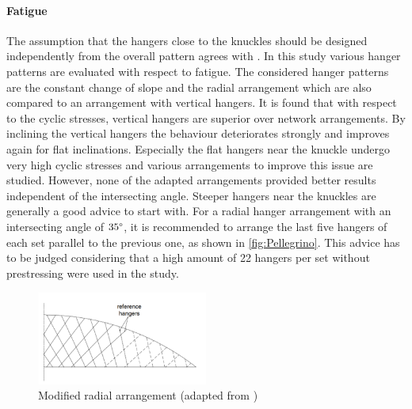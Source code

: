 \paragraph*{Fatigue}
The assumption that the hangers close to the knuckles should be designed independently from the overall pattern agrees with \citep{Pellegrino}. In this study various hanger patterns are evaluated with respect to fatigue. The considered hanger patterns are the constant change of slope and the radial arrangement which are also compared to an arrangement with vertical hangers. It is found that with respect to the cyclic stresses, vertical hangers are superior over network arrangements. By inclining the vertical hangers the behaviour deteriorates strongly and improves again for flat inclinations. Especially the flat hangers near the knuckle undergo very high cyclic stresses and various arrangements to improve this issue are studied. However, none of the adapted arrangements provided better results independent of the intersecting angle. Steeper hangers near the knuckles are generally a good advice to start with. For a radial hanger arrangement with an intersecting angle of $35\degree$, it is recommended to arrange the last five hangers of each set parallel to the previous one, as shown in \autoref{fig:Pellegrino}. This advice has to be judged considering that a high amount of 22 hangers per set without prestressing were used in the study.

\begin{figure}[H]
    \centering
    \includegraphics[width=0.5\textwidth]{Pictures/PellegrinoArrangement.png}
    \caption{Modified radial arrangement (adapted from \citep{Pellegrino})}
    \label{fig:Pellegrino}
\end{figure}

